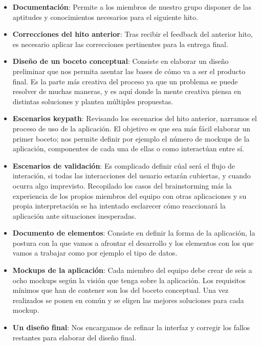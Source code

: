\documentclass[12pt]{article}
\begin{document}
\begin{itemize}

\item \textbf{Documentación}: Permite a los miembros de nuestro grupo disponer de las aptitudes y conocimientos necesarios para el siguiente hito.

\item \textbf{Correcciones del hito anterior}: Tras recibir el feedback del anterior hito, es
necesario aplicar las correcciones pertinentes para la entrega final.

\item \textbf{Diseño de un boceto conceptual}: Consiste en elaborar un diseño preliminar que nos permita asentar las bases de cómo va a ser el producto final. Es la parte más creativa del proceso ya que un problema se puede resolver de muchas maneras, y  es aquí donde la mente creativa piensa en distintas soluciones y plantea múltiples propuestas. 

\item \textbf{Escenarios keypath}: Revisando los escenarios del hito anterior, narramos el proceso de uso de la aplicación. El objetivo es que sea más fácil elaborar un primer boceto; nos permite definir por ejemplo el número de mockups de la aplicación, componentes de cada una de ellas o como interactúan entre sí.

\item \textbf{Escenarios de validación}: Es complicado definir cúal será el flujo de interación, si todas las interacciones del usuario estarán cubiertas, y cuando ocurra algo imprevisto. Recopilado los casos del brainstorming más la experiencia de los propios miembros del equipo con otras aplicaciones y su propia interpretación se ha intentado esclarecer cómo reaccionará la aplicación ante situaciones inesperadas. 

\item \textbf{Documento de elementos}: Consiste en definir la forma de la aplicación, la postura con la que vamos a afrontar el desarrollo y los elementos con los que vamos a trabajar como por ejemplo el tipo de datos.

\item \textbf{Mockups de la aplicación}: Cada miembro del equipo debe crear de seis a ocho mockups según la visión que tenga sobre la aplicación. Los requisitos mínimos que han de contener son los del boceto conceptual. Una vez realizados se ponen en común y se eligen las mejores soluciones para cada mockup.

\item \textbf{Un diseño final}: Nos encargamos de refinar la interfaz y corregir los fallos restantes para elaborar del diseño final.



\end{itemize}
\end{document}
